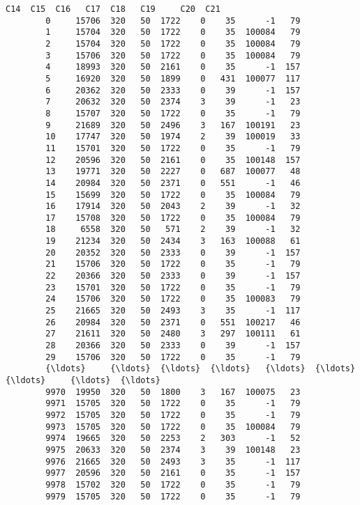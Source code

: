 \documentclass[11pt]{article}
\begin{document}
\begin{Verbatim}[commandchars=\\\{\}]
                C14  C15  C16   C17  C18   C19     C20  C21  
        0     15706  320   50  1722    0    35      -1   79  
        1     15704  320   50  1722    0    35  100084   79  
        2     15704  320   50  1722    0    35  100084   79  
        3     15706  320   50  1722    0    35  100084   79  
        4     18993  320   50  2161    0    35      -1  157  
        5     16920  320   50  1899    0   431  100077  117  
        6     20362  320   50  2333    0    39      -1  157  
        7     20632  320   50  2374    3    39      -1   23  
        8     15707  320   50  1722    0    35      -1   79  
        9     21689  320   50  2496    3   167  100191   23  
        10    17747  320   50  1974    2    39  100019   33  
        11    15701  320   50  1722    0    35      -1   79  
        12    20596  320   50  2161    0    35  100148  157  
        13    19771  320   50  2227    0   687  100077   48  
        14    20984  320   50  2371    0   551      -1   46  
        15    15699  320   50  1722    0    35  100084   79  
        16    17914  320   50  2043    2    39      -1   32  
        17    15708  320   50  1722    0    35  100084   79  
        18     6558  320   50   571    2    39      -1   32  
        19    21234  320   50  2434    3   163  100088   61  
        20    20352  320   50  2333    0    39      -1  157  
        21    15706  320   50  1722    0    35      -1   79  
        22    20366  320   50  2333    0    39      -1  157  
        23    15701  320   50  1722    0    35      -1   79  
        24    15706  320   50  1722    0    35  100083   79  
        25    21665  320   50  2493    3    35      -1  117  
        26    20984  320   50  2371    0   551  100217   46  
        27    21611  320   50  2480    3   297  100111   61  
        28    20366  320   50  2333    0    39      -1  157  
        29    15706  320   50  1722    0    35      -1   79  
        {\ldots}     {\ldots}  {\ldots}  {\ldots}   {\ldots}  {\ldots}   {\ldots}     {\ldots}  {\ldots}  
        9970  19950  320   50  1800    3   167  100075   23  
        9971  15705  320   50  1722    0    35      -1   79  
        9972  15705  320   50  1722    0    35      -1   79  
        9973  15705  320   50  1722    0    35  100084   79  
        9974  19665  320   50  2253    2   303      -1   52  
        9975  20633  320   50  2374    3    39  100148   23  
        9976  21665  320   50  2493    3    35      -1  117  
        9977  20596  320   50  2161    0    35      -1  157  
        9978  15702  320   50  1722    0    35      -1   79  
        9979  15705  320   50  1722    0    35      -1   79  

\end{Verbatim}
\end{document}
